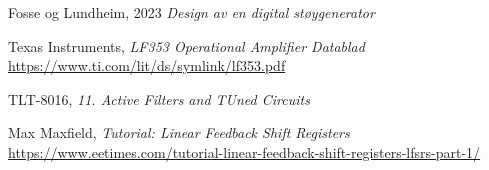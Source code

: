     Fosse og Lundheim, 2023
    \emph{Design av en digital støygenerator}

    Texas Instruments,
    \emph{LF353 Operational Amplifier Datablad}
    \url{https://www.ti.com/lit/ds/symlink/lf353.pdf}

    TLT-8016,
    \emph{11. Active Filters and TUned Circuits}

    Max Maxfield,
    \emph{Tutorial: Linear Feedback Shift Registers}
    \url{https://www.eetimes.com/tutorial-linear-feedback-shift-registers-lfsrs-part-1/}

